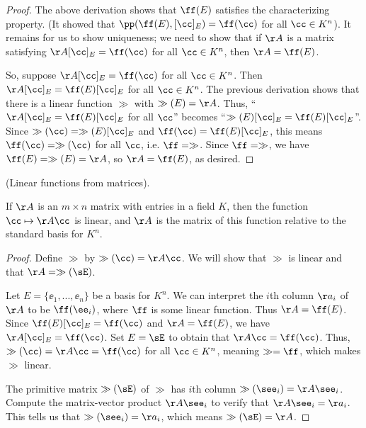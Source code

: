 \begin{proof}
   The above derivation shows that $\ff(E)$ satisfies the characterizing property. (It showed that $\pp(\ff(E), [\cc]_E) = \ff(\cc)$ for all $\cc \in K^n$). It remains for us to show uniqueness; we need to show that if $\AA$ is a matrix satisfying $\AA [\cc]_E = \ff(\cc)$ for all $\cc \in K^n$, then $\AA = \ff(E)$.
   
   So, suppose $\AA [\cc]_E = \ff(\cc)$ for all $\cc \in K^n$. Then $\AA [\cc]_E = \ff(E) [\cc]_E$ for all $\cc \in K^n$. The previous derivation shows that there is a linear function $\gg$ with $\gg(E) = \AA$. Thus, ``$\AA [\cc]_E = \ff(E) [\cc]_E$ for all $\cc$'' becomes ``${\text{$\gg(E) [\cc]_E = \ff(E) [\cc]_E$}}$''. Since $\gg(\cc) = \gg(E) [\cc]_E$ and $\ff(\cc) = \ff(E) [\cc]_E$, this means $\ff(\cc) = \gg(\cc)$ for all $\cc$, i.e. $\ff = \gg$. Since $\ff = \gg$, we have $\ff(E) = \gg(E) = \AA$, so $\AA = \ff(E)$, as desired.
\end{proof}

\begin{theorem}
    (Linear functions from matrices).
    
    If $\AA$ is an $m \times n$ matrix with entries in a field $K$, then the function $\cc \mapsto \AA \cc$ is linear, and $\AA$ is the matrix of this function relative to the standard basis for $K^n$.
\end{theorem}

\begin{proof}
    Define $\gg$ by $\gg(\cc) = \AA \cc$. We will show that $\gg$ is linear and that $\AA = \gg(\sE)$.

    Let $E = \{\ee_1, ..., \ee_n\}$ be a basis for $K^n$. We can interpret the $i$th column $\aa_i$ of $\AA$ to be $\ff(\ee_i)$, where $\ff$ is some linear function. Thus $\AA = \ff(E)$. Since $\ff(E) [\cc]_E = \ff(\cc)$ and $\AA = \ff(E)$, we have $\AA [\cc]_E = \ff(\cc)$. Set $E = \sE$ to obtain that $\AA \cc = \ff(\cc)$. Thus, $\gg(\cc) = \AA \cc = \ff(\cc)$ for all $\cc \in K^n$, meaning $\gg = \ff$, which makes $\gg$ linear.
    
    The primitive matrix $\gg(\sE)$ of $\gg$ has $i$th column $\gg(\see_i) = \AA \see_i$. Compute the matrix-vector product $\AA \see_i$ to verify that $\AA \see_i = \aa_i$. This tells us that $\gg(\see_i) = \aa_i$, which means $\gg(\sE) = \AA$.
    
\end{proof}

